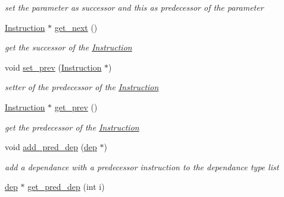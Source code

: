 \begin{DoxyCompactItemize}
\begin{DoxyCompactList}\small\item\em set the parameter as successor and this as predecessor of the parameter \end{DoxyCompactList}\item 
\hypertarget{class_instruction_a93d5d6186afcf358c5a21f4c57a0d72e}{\hyperlink{class_instruction}{Instruction} $\ast$ \hyperlink{class_instruction_a93d5d6186afcf358c5a21f4c57a0d72e}{get\+\_\+next} ()}\label{class_instruction_a93d5d6186afcf358c5a21f4c57a0d72e}

\begin{DoxyCompactList}\small\item\em get the successor of the \hyperlink{class_instruction}{Instruction} \end{DoxyCompactList}\item 
\hypertarget{class_instruction_a69d2992a0eb1fbe5fb6a38b52e13a804}{void \hyperlink{class_instruction_a69d2992a0eb1fbe5fb6a38b52e13a804}{set\+\_\+prev} (\hyperlink{class_instruction}{Instruction} $\ast$)}\label{class_instruction_a69d2992a0eb1fbe5fb6a38b52e13a804}

\begin{DoxyCompactList}\small\item\em setter of the predecessor of the \hyperlink{class_instruction}{Instruction} \end{DoxyCompactList}\item 
\hypertarget{class_instruction_afd6f27235469926b1e7979220495a6f0}{\hyperlink{class_instruction}{Instruction} $\ast$ \hyperlink{class_instruction_afd6f27235469926b1e7979220495a6f0}{get\+\_\+prev} ()}\label{class_instruction_afd6f27235469926b1e7979220495a6f0}

\begin{DoxyCompactList}\small\item\em get the predecessor of the \hyperlink{class_instruction}{Instruction} \end{DoxyCompactList}\item 
\hypertarget{class_instruction_a3121dad231e2b4c27ac3cae6c8627ece}{void \hyperlink{class_instruction_a3121dad231e2b4c27ac3cae6c8627ece}{add\+\_\+pred\+\_\+dep} (\hyperlink{structdep}{dep} $\ast$)}\label{class_instruction_a3121dad231e2b4c27ac3cae6c8627ece}

\begin{DoxyCompactList}\small\item\em add a dependance with a predecessor instruction to the dependance type list \end{DoxyCompactList}\item 
\hypertarget{class_instruction_ab32531f8dd490b1c8396b6723f87bfae}{\hyperlink{structdep}{dep} $\ast$ \hyperlink{class_instruction_ab32531f8dd490b1c8396b6723f87bfae}{get\+\_\+pred\+\_\+dep} (int i)}\label{class_instruction_ab32531f8dd490b1c8396b6723f87bfae}


\end{DoxyCompactItemize}
